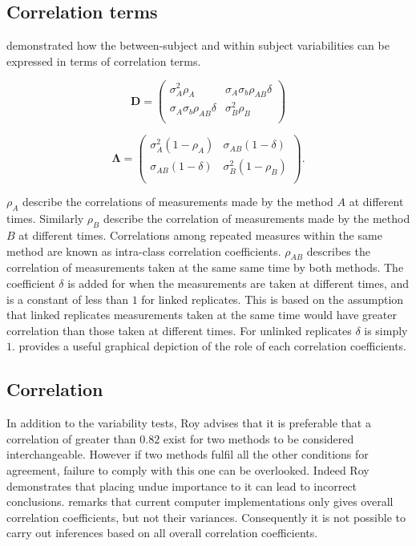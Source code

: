 \documentclass[12pt, a4paper]{report}
\theoremstyle{plain}
\theoremstyle{definition}
\theoremstyle{remark}
\begin{document}
		\subsection{Correlation terms}
		\citet{hamlett} demonstrated how the between-subject and within subject variabilities can be expressed in terms of
		correlation terms.
		
		\[
		\boldsymbol{D} = \left( \begin{array}{cc}
		\sigma^2_{A}\rho_{A} & \sigma_{A}\sigma_{b}\rho_{AB}\delta \\
		\sigma_{A}\sigma_{b}\rho_{AB}\delta & \sigma^2_{B}\rho_{B}\\
		
		\end{array}\right)
		\]
		
		\[
		\boldsymbol{\Lambda} = \left(
		\begin{array}{cc}
		\sigma^2_{A}(1-\rho_{A}) & \sigma_{AB}(1-\delta)  \\
		\sigma_{AB}(1-\delta) & \sigma^2_{B}(1-\rho_{B}) \\
		\end{array}\right).
		\]
		
		$\rho_{A}$ describe the correlations of measurements made by the method $A$ at different times. Similarly $\rho_{B}$ describe the correlation of measurements made by the method $B$ at different times. Correlations among repeated measures within the same method are known as intra-class correlation coefficients. $\rho_{AB}$ describes the correlation of measurements taken at the same same time by both methods. The coefficient $\delta$ is added for when the measurements are taken at different times, and is a constant of less than $1$ for linked replicates. This is based on the assumption that linked replicates measurements taken at the same time would have greater correlation than those taken at different times. For unlinked replicates $\delta$ is simply $1$. \citet{hamlett} provides a useful graphical depiction of the role of each correlation coefficients.
		

	\subsection{Correlation}
	In addition to the variability tests, Roy advises that it is preferable that a correlation of greater than $0.82$ exist for two methods to be considered interchangeable. However if two methods fulfil all the other conditions for agreement, failure to comply with this one can be overlooked. Indeed Roy demonstrates that placing undue importance to it can lead to incorrect conclusions. \citet{roy} remarks that current computer implementations only gives overall correlation coefficients, but not their variances. Consequently it is not possible to carry out inferences based on all overall correlation coefficients.
\end{document}
